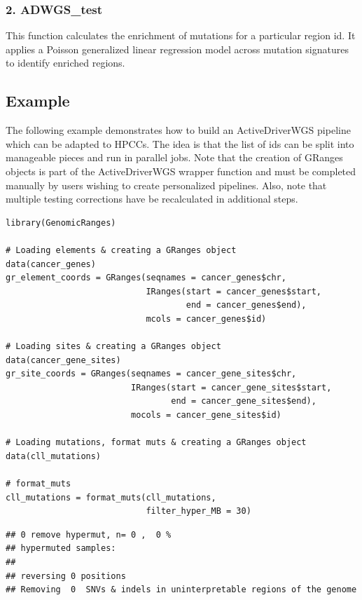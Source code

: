 \documentclass[]{article}
\begin{document}
\subsubsection{2. ADWGS\_test}\label{adwgs_test}

This function calculates the enrichment of mutations for a particular
region id. It applies a Poisson generalized linear regression model
across mutation signatures to identify enriched regions.

\subsection{Example}\label{example}

The following example demonstrates how to build an ActiveDriverWGS
pipeline which can be adapted to HPCCs. The idea is that the list of ids
can be split into manageable pieces and run in parallel jobs. Note that
the creation of GRanges objects is part of the ActiveDriverWGS wrapper
function and must be completed manually by users wishing to create
personalized pipelines. Also, note that multiple testing corrections
have be recalculated in additional steps.

\begin{verbatim}
library(GenomicRanges)

# Loading elements & creating a GRanges object
data(cancer_genes)
gr_element_coords = GRanges(seqnames = cancer_genes$chr,
                            IRanges(start = cancer_genes$start,
                                    end = cancer_genes$end),
                            mcols = cancer_genes$id)

# Loading sites & creating a GRanges object
data(cancer_gene_sites)
gr_site_coords = GRanges(seqnames = cancer_gene_sites$chr,
                         IRanges(start = cancer_gene_sites$start,
                                 end = cancer_gene_sites$end),
                         mocols = cancer_gene_sites$id)

# Loading mutations, format muts & creating a GRanges object
data(cll_mutations)

# format_muts
cll_mutations = format_muts(cll_mutations,
                            filter_hyper_MB = 30)
\end{verbatim}

\begin{verbatim}
## 0 remove hypermut, n= 0 ,  0 %
## hypermuted samples:   
## 
## reversing 0 positions
## Removing  0  SNVs & indels in uninterpretable regions of the genome
\end{verbatim}
\end{document}
